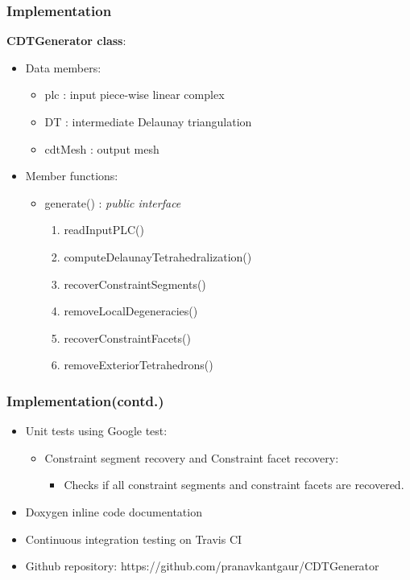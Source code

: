 \documentclass{beamer}
\begin{document}
	\begin{frame}
		\frametitle{Implementation}
			\textbf{CDTGenerator class}:
				\begin{itemize}
					\item Data members:
						\begin{itemize}
							\item plc : input piece-wise linear complex
							\item DT : intermediate Delaunay triangulation
							\item cdtMesh : output mesh	
						\end{itemize}
					\item Member functions: 
						\begin{itemize}
							\item generate() : \textit{public interface}
								\begin{enumerate}
									\item readInputPLC()
									\item computeDelaunayTetrahedralization()
									\item recoverConstraintSegments()
									\item removeLocalDegeneracies()
									\item recoverConstraintFacets()
									\item removeExteriorTetrahedrons()	
								\end{enumerate}
						\end{itemize}
				\end{itemize}
	\end{frame}	
	\begin{frame}
		\frametitle{Implementation(contd.)}
			\begin{itemize}
				\item Unit tests using Google test:
					\begin{itemize}
						\item Constraint segment recovery and Constraint facet recovery:
							\begin{itemize}
								\item Checks if all constraint segments and constraint facets are recovered.
							\end{itemize}	
					\end{itemize}		
				\item Doxygen inline code documentation
				\item Continuous integration testing on Travis CI	
				\item Github repository: https://github.com/pranavkantgaur/CDTGenerator
			\end{itemize}
	\end{frame}	
\end{document}
